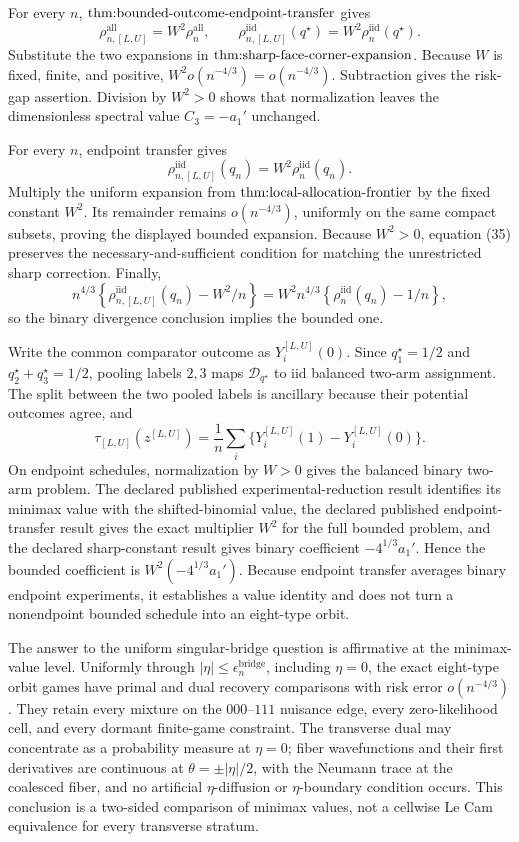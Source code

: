 For every \(n\), \(\textnormal{thm:bounded-outcome-endpoint-transfer}\) gives
\[
\rho_{n,[L,U]}^{\mathrm{all}}=W^2\rho_n^{\mathrm{all}},
\qquad
\rho_{n,[L,U]}^{\mathrm{iid}}(q^\star)=W^2\rho_n^{\mathrm{iid}}(q^\star).
\]
Substitute the two expansions in \(\textnormal{thm:sharp-face-corner-expansion}\).  Because \(W\) is fixed, finite, and positive, \(W^2o(n^{-4/3})=o(n^{-4/3})\).  Subtraction gives the risk-gap assertion.  Division by \(W^2>0\) shows that normalization leaves the dimensionless spectral value \(C_3=-a_1'\) unchanged.

For every \(n\), endpoint transfer gives
\[
\rho_{n,[L,U]}^{\mathrm{iid}}(q_n)
=W^2\rho_n^{\mathrm{iid}}(q_n).
\tag{35}
\]
Multiply the uniform expansion from \(\textnormal{thm:local-allocation-frontier}\) by the fixed constant \(W^2\).  Its remainder remains \(o(n^{-4/3})\), uniformly on the same compact subsets, proving the displayed bounded expansion.  Because \(W^2>0\), equation (35) preserves the necessary-and-sufficient condition for matching the unrestricted sharp correction.  Finally,
\[
n^{4/3}\left\{\rho_{n,[L,U]}^{\mathrm{iid}}(q_n)-W^2/n\right\}
=W^2n^{4/3}\left\{\rho_n^{\mathrm{iid}}(q_n)-1/n\right\},
\]
so the binary divergence conclusion implies the bounded one.

Write the common comparator outcome as \(Y_i^{[L,U]}(0)\).  Since \(q_1^\star=1/2\) and \(q_2^\star+q_3^\star=1/2\), pooling labels \(2,3\) maps \(\mathcal D_{q^\star}\) to iid balanced two-arm assignment.  The split between the two pooled labels is ancillary because their potential outcomes agree, and
\[
\tau_{[L,U]}(z^{[L,U]})
=\frac1n\sum_i\{Y_i^{[L,U]}(1)-Y_i^{[L,U]}(0)\}.
\]
On endpoint schedules, normalization by \(W>0\) gives the balanced binary two-arm problem.  The declared published experimental-reduction result identifies its minimax value with the shifted-binomial value, the declared published endpoint-transfer result gives the exact multiplier \(W^2\) for the full bounded problem, and the declared sharp-constant result gives binary coefficient \(-4^{1/3}a_1'\).  Hence the bounded coefficient is \(W^2(-4^{1/3}a_1')\).  Because endpoint transfer averages binary endpoint experiments, it establishes a value identity and does not turn a nonendpoint bounded schedule into an eight-type orbit.

The answer to the uniform singular-bridge question is affirmative at the minimax-value level.  Uniformly through \(|\eta|\leq\epsilon_n^{\mathrm{bridge}}\), including \(\eta=0\), the exact eight-type orbit games have primal and dual recovery comparisons with risk error \(o(n^{-4/3})\).  They retain every mixture on the \(000\)--\(111\) nuisance edge, every zero-likelihood cell, and every dormant finite-game constraint.  The transverse dual may concentrate as a probability measure at \(\eta=0\); fiber wavefunctions and their first derivatives are continuous at \(\theta=\pm|\eta|/2\), with the Neumann trace at the coalesced fiber, and no artificial \(\eta\)-diffusion or \(\eta\)-boundary condition occurs.  This conclusion is a two-sided comparison of minimax values, not a cellwise Le Cam equivalence for every transverse stratum.

